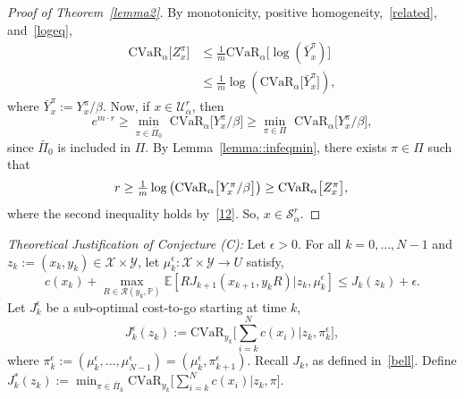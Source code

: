 \documentclass[letterpaper, 10 pt, conference]{ieeeconf}  %
\begin{document}
\begin{proof}[Proof of Theorem~\ref{lemma2}]
By monotonicity, positive homogeneity,~\eqref{related}, and~\eqref{logeq},
%
\begin{equation}\begin{aligned}
\text{CVaR}_\alpha\big[ Z_x^\pi \big] & \leq \textstyle\frac{1}{m} \text{CVaR}_\alpha\big[ \log\left( \bar{Y}_x^\pi \right) \big] \\
& \leq \textstyle\frac{1}{m} \log \left(\text{CVaR}_\alpha\big[ \bar{Y}_x^\pi \big] \right),
\end{aligned}\label{12}\end{equation}
%
where $\bar{Y}_x^\pi := Y_x^\pi/\beta$. Now, if $x \in \mathcal{U}_\alpha^r$, then
%
\begin{equation*}
e^{m\cdot r} \geq {\underset{\pi \in \bar{\Pi}_0}\min}\text{ CVaR}_\alpha \big[ Y_x^\pi /\beta \big] \geq {\underset{\pi \in \Pi}\min}\text{ CVaR}_\alpha \big[ Y_x^\pi /\beta \big], 
\end{equation*}
%
since $\bar{\Pi}_0$ is included in $\Pi$. By Lemma~\ref{lemma::infeqmin}, there exists $\pi \in \Pi$ such that
\begin{equation*}
r \geq \textstyle\frac{1}{m}\log \left( \text{CVaR}_\alpha \big[  Y_x^\pi /\beta \big] \right) \geq \text{CVaR}_\alpha\big[ Z_x^\pi \big], \\
\end{equation*}
where the second inequality holds by~\eqref{12}. So, $x \in \mathcal{S}_\alpha^r$.
\end{proof}
\vspace{1em}
\textit{Theoretical Justification of Conjecture (C):}
Let $\epsilon > 0$. For all $k = 0, \dots, N-1$ and $z_k := (x_k, y_k) \in \mathcal{X} \times \mathcal{Y}$, let $\mu_k^\epsilon : \mathcal{X} \times \mathcal{Y} \to U$ satisfy,
%
\begin{equation} 
c(x_k) + {\underset{R \in \mathcal{R}(y_k, \mathbb{P})}\max} \mathbb{E}[ RJ_{k+1}(x_{k+1}, y_k R) | z_k, \mu_k^\epsilon] \leq J_k(z_k) + \epsilon.
\label{first}\end{equation} 
%
Let $J_k^\epsilon$ be a sub-optimal cost-to-go starting at time $k$,
%
\begin{equation} 
J_k^\epsilon(z_k) := \text{CVaR}_{y_k}\big[\textstyle \sum_{i=k}^N c(x_i) \big| z_k, \pi_k^\epsilon \big],
\label{Jkeps}\end{equation}
%
where $\pi_k^\epsilon := (\mu_k^\epsilon,\dots,\mu_{N-1}^\epsilon) = (\mu_k^\epsilon, \pi_{k+1}^\epsilon)$. Recall $J_k$, as defined in~\eqref{bell}. Define $J_k^*(z_k) := \min_{\pi \in \bar{\Pi}_k} \text{CVaR}_{y_k}\big[\textstyle \sum_{i=k}^N c(x_i) \big| z_k, \pi \big]$.
\end{document}
